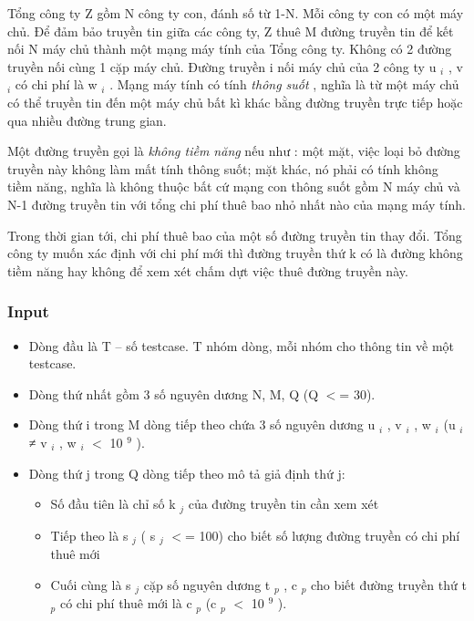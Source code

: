 

Tổng công ty Z gồm N công ty con, đánh số từ 1-N. Mỗi công ty con có một máy chủ. Để đảm bảo truyền tin giữa các công ty, Z thuê M đường truyền tin để kết nối N máy chủ thành một mạng máy tính của Tổng công ty. Không có 2 đường truyền nối cùng 1 cặp máy chủ. Đường truyền i nối máy chủ của 2 công ty u $_ i $ , v $_ i $ có chi phí là w $_ i $ . Mạng máy tính có tính \emph{ thông suốt } , nghĩa là từ một máy chủ có thể truyền tin đến một máy chủ bất kì khác bằng đường truyền trực tiếp hoặc qua nhiều đường trung gian.

Một đường truyền gọi là \emph{ không tiềm năng } nếu như : một mặt, việc loại bỏ đường truyền này không làm mất tính thông suốt; mặt khác, nó phải có tính không tiềm năng, nghĩa là không thuộc bất cứ mạng con thông suốt gồm N máy chủ và N-1 đường truyền tin với tổng chi phí thuê bao nhỏ nhất nào của mạng máy tính.

Trong thời gian tới, chi phí thuê bao của một số đường truyền tin thay đổi. Tổng công ty muốn xác định với chi phí mới thì đường truyền thứ k có là đường không tiềm năng hay không để xem xét chấm dựt việc thuê đường truyền này.

\subsubsection{Input}
\begin{itemize}
	\item Dòng đầu là T – số testcase. T nhóm dòng, mỗi nhóm cho thông tin về một testcase.
	\item Dòng thứ nhất gồm 3 số nguyên dương N, M, Q (Q $<$= 30).
	\item Dòng thứ i trong M dòng tiếp theo chứa 3 số nguyên dương u $_ i $ , v $_ i $ , w $_ i $ (u $_ i $ ≠ v $_ i $ , w $_ i $ $<$ 10 $^ 9 $ ).
	\item Dòng thứ j trong Q dòng tiếp theo mô tả giả định thứ j:
\begin{itemize}
	\item Số đầu tiên là chỉ số k $_ j $ của đường truyền tin cần xem xét
	\item Tiếp theo là s $_ j $ ( s $_ j $ $<$= 100) cho biết số lượng đường truyền có chi phí thuê mới
	\item Cuối cùng là s $_ j $ cặp số nguyên dương t $_ p $ , c $_ p $ cho biết đường truyền thứ t $_ p $ có chi phí thuê mới là c $_ p $ (c $_ p $ $<$ 10 $^ 9 $ ).
\end{itemize}
\end{itemize}

